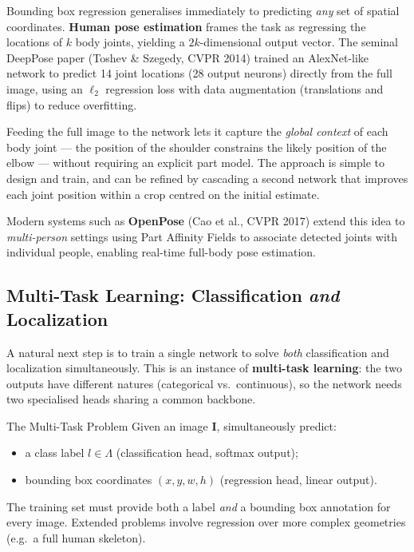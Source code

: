 \documentclass[11pt,a4paper]{article}
\newcommand{\term}[1]{\textcolor{DefGreen}{\textbf{#1}}}
\begin{document}
Bounding box regression generalises immediately to predicting \emph{any} set of spatial coordinates. \term{Human pose estimation} frames the task as regressing the locations of $k$ body joints, yielding a $2k$-dimensional output vector. The seminal DeepPose paper (Toshev \& Szegedy, CVPR 2014) trained an AlexNet-like network to predict 14 joint locations (28 output neurons) directly from the full image, using an $\ell_2$ regression loss with data augmentation (translations and flips) to reduce overfitting.

\begin{insightbox}
Feeding the full image to the network lets it capture the \emph{global context} of each body joint — the position of the shoulder constrains the likely position of the elbow — without requiring an explicit part model. The approach is simple to design and train, and can be refined by cascading a second network that improves each joint position within a crop centred on the initial estimate.
\end{insightbox}

Modern systems such as \textbf{OpenPose} (Cao et al., CVPR 2017) extend this idea to \emph{multi-person} settings using Part Affinity Fields to associate detected joints with individual people, enabling real-time full-body pose estimation.

\subsection{Multi-Task Learning: Classification \emph{and} Localization}
\label{sec:multitask}

A natural next step is to train a single network to solve \emph{both} classification and localization simultaneously. This is an instance of \term{multi-task learning}: the two outputs have different natures (categorical vs.\ continuous), so the network needs two specialised heads sharing a common backbone.

\begin{defbox}{The Multi-Task Problem}
Given an image $\mathbf{I}$, simultaneously predict:
\begin{itemize}
  \item a class label $l \in \Lambda$ (classification head, softmax output);
  \item bounding box coordinates $(x, y, w, h)$ (regression head, linear output).
\end{itemize}
The training set must provide both a label \emph{and} a bounding box annotation for every image. Extended problems involve regression over more complex geometries (e.g.\ a full human skeleton).
\end{defbox}
\end{document}
